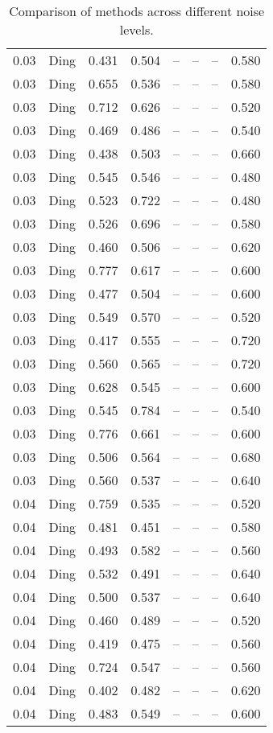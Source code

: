 \begin{table}[H]
\begin{tabular}{l c l l l}
0.03 & Ding & 0.431 & 0.504 & -- & -- & -- & 0.580 \\
0.03 & Ding & 0.655 & 0.536 & -- & -- & -- & 0.580 \\
0.03 & Ding & 0.712 & 0.626 & -- & -- & -- & 0.520 \\
0.03 & Ding & 0.469 & 0.486 & -- & -- & -- & 0.540 \\
0.03 & Ding & 0.438 & 0.503 & -- & -- & -- & 0.660 \\
0.03 & Ding & 0.545 & 0.546 & -- & -- & -- & 0.480 \\
0.03 & Ding & 0.523 & 0.722 & -- & -- & -- & 0.480 \\
0.03 & Ding & 0.526 & 0.696 & -- & -- & -- & 0.580 \\
0.03 & Ding & 0.460 & 0.506 & -- & -- & -- & 0.620 \\
0.03 & Ding & 0.777 & 0.617 & -- & -- & -- & 0.600 \\
0.03 & Ding & 0.477 & 0.504 & -- & -- & -- & 0.600 \\
0.03 & Ding & 0.549 & 0.570 & -- & -- & -- & 0.520 \\
0.03 & Ding & 0.417 & 0.555 & -- & -- & -- & 0.720 \\
0.03 & Ding & 0.560 & 0.565 & -- & -- & -- & 0.720 \\
0.03 & Ding & 0.628 & 0.545 & -- & -- & -- & 0.600 \\
0.03 & Ding & 0.545 & 0.784 & -- & -- & -- & 0.540 \\
0.03 & Ding & 0.776 & 0.661 & -- & -- & -- & 0.600 \\
0.03 & Ding & 0.506 & 0.564 & -- & -- & -- & 0.680 \\
0.03 & Ding & 0.560 & 0.537 & -- & -- & -- & 0.640 \\
0.04 & Ding & 0.759 & 0.535 & -- & -- & -- & 0.520 \\
0.04 & Ding & 0.481 & 0.451 & -- & -- & -- & 0.580 \\
0.04 & Ding & 0.493 & 0.582 & -- & -- & -- & 0.560 \\
0.04 & Ding & 0.532 & 0.491 & -- & -- & -- & 0.640 \\
0.04 & Ding & 0.500 & 0.537 & -- & -- & -- & 0.640 \\
0.04 & Ding & 0.460 & 0.489 & -- & -- & -- & 0.520 \\
0.04 & Ding & 0.419 & 0.475 & -- & -- & -- & 0.560 \\
0.04 & Ding & 0.724 & 0.547 & -- & -- & -- & 0.560 \\
0.04 & Ding & 0.402 & 0.482 & -- & -- & -- & 0.620 \\
0.04 & Ding & 0.483 & 0.549 & -- & -- & -- & 0.600 \\
\midrule
\bottomrule
\end{tabular}
\label{tab:SyntheticNoise}
\caption{Comparison of methods across different noise levels.}
\end{table}
